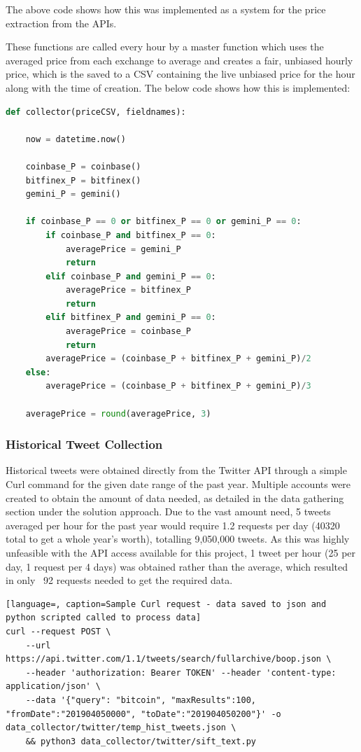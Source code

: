 \documentclass[oneside, 12pt]{article}
\begin{document}
			The above code shows how this was implemented as a system for the price extraction from the APIs.
			
			These functions are called every hour by a master function which uses the averaged price from each exchange to average and creates a fair, unbiased hourly price, which is the saved to a CSV containing the live unbiased price for the hour along with the time of creation. The below code shows how this is implemented:
			
			\begin{lstlisting}[language=Python, caption=Creation of the unbiased hourly price]
def collector(priceCSV, fieldnames):
				
	now = datetime.now()
				
	coinbase_P = coinbase()
	bitfinex_P = bitfinex()
	gemini_P = gemini()
				
	if coinbase_P == 0 or bitfinex_P == 0 or gemini_P == 0:
		if coinbase_P and bitfinex_P == 0:
			averagePrice = gemini_P
			return
		elif coinbase_P and gemini_P == 0:
			averagePrice = bitfinex_P
			return
		elif bitfinex_P and gemini_P == 0:
			averagePrice = coinbase_P
			return
		averagePrice = (coinbase_P + bitfinex_P + gemini_P)/2
	else:
		averagePrice = (coinbase_P + bitfinex_P + gemini_P)/3
				
	averagePrice = round(averagePrice, 3)
			\end{lstlisting}
			
			\subsubsection{Historical Tweet Collection}
			Historical tweets were obtained directly from the Twitter API through a simple Curl command for the given date range of the past year. Multiple accounts were created to obtain the amount of data needed, as detailed in the data gathering section under the solution approach. Due to the vast amount need, 5 tweets averaged per hour for the past year would require 1.2 requests per day (40320 total to get a whole year's worth), totalling 9,050,000 tweets. As this was highly unfeasible with the API access available for this project, 1 tweet per hour (25 per day, 1 request per 4 days) was obtained rather than the average, which resulted in only ~92 requests needed to get the required data. 
			
			\begin{lstlisting}[language=, caption=Sample Curl request - data saved to json and python scripted called to process data]
curl --request POST \
	--url https://api.twitter.com/1.1/tweets/search/fullarchive/boop.json \
	--header 'authorization: Bearer TOKEN' --header 'content-type: application/json' \
	--data '{"query": "bitcoin", "maxResults":100, "fromDate":"201904050000", "toDate":"201904050200"}' -o data_collector/twitter/temp_hist_tweets.json \
	&& python3 data_collector/twitter/sift_text.py
			\end{lstlisting}
			
\end{document}
